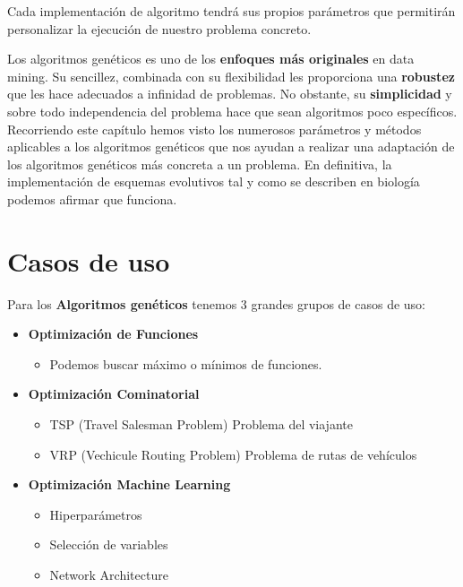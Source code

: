 \documentclass[
  a4paper,
  DIV=11,
  numbers=noendperiod]{scrreprt}
\providecommand{\tightlist}{%
  \setlength{\itemsep}{0pt}\setlength{\parskip}{0pt}}\usepackage{longtable,booktabs,array}
\begin{document}
Cada implementación de algoritmo tendrá sus propios parámetros que
permitirán personalizar la ejecución de nuestro problema concreto.

\begin{tcolorbox}[enhanced jigsaw, titlerule=0mm, opacitybacktitle=0.6, rightrule=.15mm, opacityback=0, colframe=quarto-callout-important-color-frame, toprule=.15mm, toptitle=1mm, colbacktitle=quarto-callout-important-color!10!white, colback=white, bottomtitle=1mm, left=2mm, breakable, bottomrule=.15mm, leftrule=.75mm, coltitle=black, arc=.35mm, title=\textcolor{quarto-callout-important-color}{\faExclamation}\hspace{0.5em}{Recordad}]

Los algoritmos genéticos es uno de los \textbf{enfoques más originales}
en data mining. Su sencillez, combinada con su flexibilidad les
proporciona una \textbf{robustez} que les hace adecuados a infinidad de
problemas. No obstante, su \textbf{simplicidad} y sobre todo
independencia del problema hace que sean algoritmos poco específicos.
Recorriendo este capítulo hemos visto los numerosos parámetros y métodos
aplicables a los algoritmos genéticos que nos ayudan a realizar una
adaptación de los algoritmos genéticos más concreta a un problema. En
definitiva, la implementación de esquemas evolutivos tal y como se
describen en biología podemos afirmar que funciona.

\end{tcolorbox}

\section{Casos de uso}\label{casos-de-uso-1}

Para los \textbf{Algoritmos genéticos} tenemos 3 grandes grupos de casos
de uso:

\begin{itemize}
\tightlist
\item
  \textbf{Optimización de Funciones}

  \begin{itemize}
  \tightlist
  \item
    Podemos buscar máximo o mínimos de funciones.
  \end{itemize}
\item
  \textbf{Optimización Cominatorial}

  \begin{itemize}
  \tightlist
  \item
    TSP (Travel Salesman Problem) Problema del viajante
  \item
    VRP (Vechicule Routing Problem) Problema de rutas de vehículos
  \end{itemize}
\item
  \textbf{Optimización Machine Learning}

  \begin{itemize}
  \tightlist
  \item
    Hiperparámetros
  \item
    Selección de variables
  \item
    Network Architecture
  \end{itemize}
\end{itemize}
\end{document}
